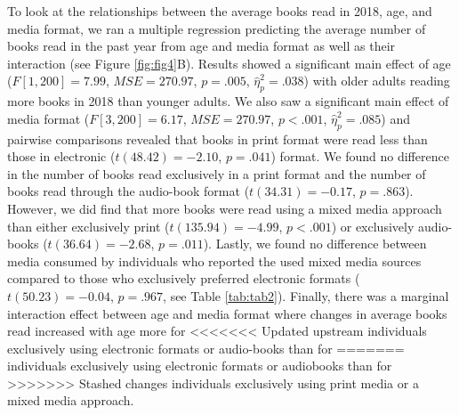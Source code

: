 \documentclass[man, fleqn, noextraspace]{apa6}
\theoremstyle{definition}
\theoremstyle{definition}
\theoremstyle{definition}
\theoremstyle{remark}
\begin{document}
To look at the relationships between the average books read in 2018,
age, and media format, we ran a multiple regression predicting the
average number of books read in the past year from age and media format
as well as their interaction (see Figure \ref{fig:fig4}B). Results
showed a significant main effect of age (\(F[1, 200] = 7.99\),
\(\mathit{MSE} = 270.97\), \(p = .005\), \(\hat{\eta}^2_p = .038\)) with
older adults reading more books in 2018 than younger adults. We also saw
a significant main effect of media format (\(F[3, 200] = 6.17\),
\(\mathit{MSE} = 270.97\), \(p < .001\), \(\hat{\eta}^2_p = .085\)) and
pairwise comparisons revealed that books in print format were read less
than those in electronic (\(t(48.42) = -2.10\), \(p = .041\)) format. We
found no difference in the number of books read exclusively in a print
format and the number of books read through the audio-book format
(\(t(34.31) = -0.17\), \(p = .863\)). However, we did find that more
books were read using a mixed media approach than either exclusively
print (\(t(135.94) = -4.99\), \(p < .001\)) or exclusively audio-books
(\(t(36.64) = -2.68\), \(p = .011\)). Lastly, we found no difference
between media consumed by individuals who reported the used mixed media
sources compared to those who exclusively preferred electronic formats
(\(t(50.23) = -0.04\), \(p = .967\), see Table \ref{tab:tab2}). Finally,
there was a marginal interaction effect between age and media format
where changes in average books read increased with age more for
<<<<<<< Updated upstream
individuals exclusively using electronic formats or audio-books than for
=======
individuals exclusively using electronic formats or audiobooks than for
>>>>>>> Stashed changes
individuals exclusively using print media or a mixed media approach.
\end{document}
